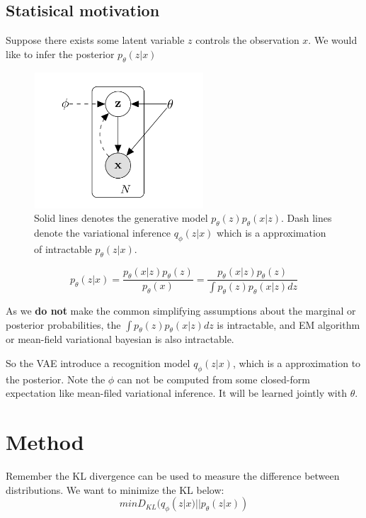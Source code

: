 \documentclass{article}
\begin{document}
\subsection{Statisical motivation}
Suppose there exists some latent variable $z$ controls the observation $x$. We would like to infer the posterior $p_{\theta}(z|x)$
\begin{figure}[h]
\centering
\includegraphics[width=2.5in,height=2in]{graph2}
\caption{Solid lines denotes the generative model $p_{\theta}(z)p_{\theta}(x|z)$. Dash lines denote the variational inference $q_{\phi}(z|x)$ which is a approximation of intractable $p_{\theta}(z|x)$.}
\end{figure}
$$p_{\theta}(z|x)=\frac{p_{\theta}(x|z)p_{\theta}(z)}{p_{\theta}(x)}=\frac{p_{\theta}(x|z)p_{\theta}(z)}{\int p_{\theta}(z)p_{\theta}(x|z)dz}$$

As we \textbf{do not} make the common simplifying assumptions about the marginal or posterior probabilities, the $\int p_{\theta}(z)p_{\theta}(x|z)dz$ is intractable, and EM algorithm or mean-field variational bayesian is also intractable.

So the VAE introduce a recognition model $q_{\phi}(z|x)$, which is a approximation to the posterior. Note the $\phi$ can not be computed from some closed-form expectation like mean-filed variational inference. It will be learned jointly with $\theta$.
\section{Method}
Remember the KL divergence can be used to measure the difference between distributions. We want to minimize the KL below:
$$min  D_{KL} (q_{\phi}(z|x)||p_{\theta}(z|x))$$
\end{document}
